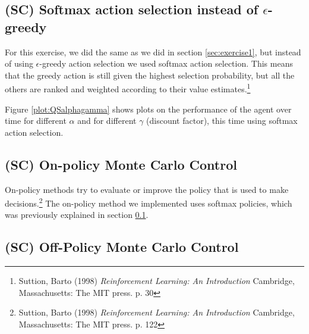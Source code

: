 \documentclass{article}
\begin{document}
\subsection{(SC) Softmax action selection instead of $\epsilon$-greedy}\label{sec:exercise3}
For this exercise, we did the same as we did in section \ref{sec:exercise1}, but instead of using $\epsilon$-greedy action selection we used softmax action selection. This means that the greedy action is still given the highest selection probability, but all the others are ranked and weighted according to their value estimates.\footnote{Suttion, Barto (1998) \textit{Reinforcement Learning: An Introduction} Cambridge, Massachusetts: The MIT press. p. 30}

Figure \ref{plot:QSalphagamma} shows plots on the performance of the agent over time for different $\alpha$ and for different $\gamma$ (discount factor), this time using softmax action selection.

 \label{plot:QSalphagamma}


\subsection{(SC) On-policy Monte Carlo Control}\label{sec:exercise4a}
On-policy methods try to evaluate or improve the policy that is used to make decisions.\footnote{Suttion, Barto (1998) \textit{Reinforcement Learning: An Introduction} Cambridge, Massachusetts: The MIT press. p. 122} The on-policy method we implemented uses softmax policies, which was previously explained in section \ref{sec:exercise3}.

\subsection{(SC) Off-Policy Monte Carlo Control}\label{sec:exercise4b}
\end{document}
